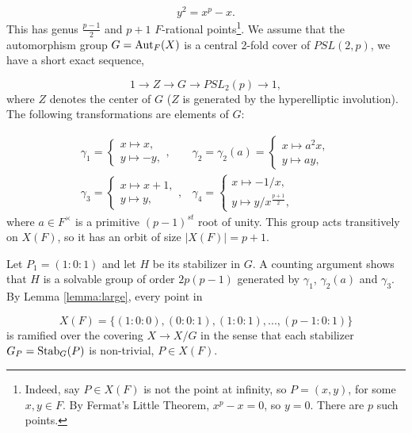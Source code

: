 \documentclass[12pt]{article}
\numberwithin{equation}{section}
\def\Aut{{\rm{Aut}}}
\def\Stab{{\rm{Stab}}}
\begin{document}
\[
y^2=x^p-x.
\]
This has genus $\frac{p-1}{2}$ and $p+1$ $F$-rational
points\footnote{Indeed, say $P\in X(F)$ is not
the point at infinity, so $P=(x,y)$,
for some $x,y\in F$. By Fermat's
Little Theorem, $x^p-x=0$, so $y=0$. 
There are $p$ such points.}. 
We assume that the automorphism group $G=\Aut_F(X)$ is
a central 2-fold cover of $PSL(2,p)$,
we have a short exact sequence,

\begin{equation}
\label{eqn:*}
1\rightarrow Z \rightarrow G\rightarrow PSL_2(p)\rightarrow 1,
\end{equation}
where $Z$ denotes the center of $G$ 
($Z$ is generated by the hyperelliptic involution).
The following transformations are elements of
$G$:

\begin{equation}
\label{eqn:3.2}
\begin{array}{cc}
\gamma_1=
\left\{
\begin{array}{c}
x\longmapsto x,\\
y\longmapsto -y,
\end{array}
\right. ,
&
\gamma_2=\gamma_2(a)=
\left\{
\begin{array}{c}
x\longmapsto a^2x,\\
y\longmapsto ay,
\end{array}
\right.\\
\gamma_3=
\left\{
\begin{array}{c}
x\longmapsto x+1,\\
y\longmapsto y,
\end{array}
\right. ,
&
\gamma_4=
\left\{
\begin{array}{c}
x\longmapsto -1/x,\\
y\longmapsto y/x^{\frac{p+1}{2}},
\end{array}
\right. 
\end{array}
\end{equation}
where $a\in F^\times$ is a primitive $(p-1)^{st}$ root of unity.
This group acts transitively on $X(F)$,
so it has an orbit of size $|X(F)|=p+1$.

Let $P_1=(1:0:1)$ and let $H$ be its stabilizer in $G$.
A counting argument shows that $H$ is a solvable group of order 
$2p(p-1)$ generated by 
$\gamma_1$, $\gamma_2(a)$ and $\gamma_3$.
By Lemma \ref{lemma:large}, every point in 

\[
X(F)=\{(1:0:0),(0:0:1),(1:0:1),...,(p-1:0:1)  \}
\]
is ramified over the covering $X\rightarrow X/G$
in the sense that each stabilizer $G_P=\Stab_G(P)$
is non-trivial, $P\in X(F)$. 
\end{document}
